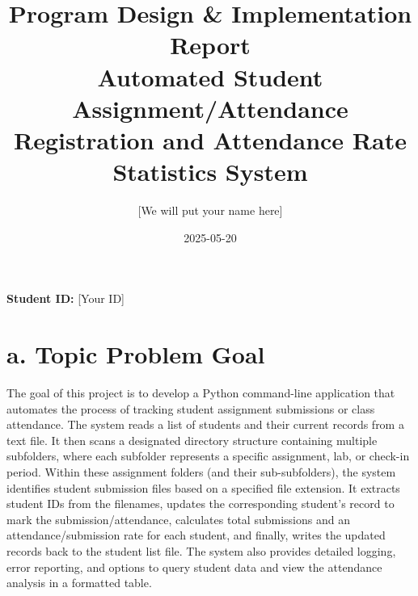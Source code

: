 \documentclass[11pt, a4paper]{article}
\title{Program Design \& Implementation Report \\ \large Automated Student Assignment/Attendance Registration and Attendance Rate Statistics System}
\author{[We will put your name here]}
\date{2025-05-20}
\begin{document}
\maketitle
\noindent\textbf{Student ID:} [Your ID]
\vspace{1cm}

\section*{a. Topic Problem Goal}
The goal of this project is to develop a Python command-line application that automates the process of tracking student assignment submissions or class attendance. The system reads a list of students and their current records from a text file. It then scans a designated directory structure containing multiple subfolders, where each subfolder represents a specific assignment, lab, or check-in period. Within these assignment folders (and their sub-subfolders), the system identifies student submission files based on a specified file extension. It extracts student IDs from the filenames, updates the corresponding student's record to mark the submission/attendance, calculates total submissions and an attendance/submission rate for each student, and finally, writes the updated records back to the student list file. The system also provides detailed logging, error reporting, and options to query student data and view the attendance analysis in a formatted table.
\end{document}
